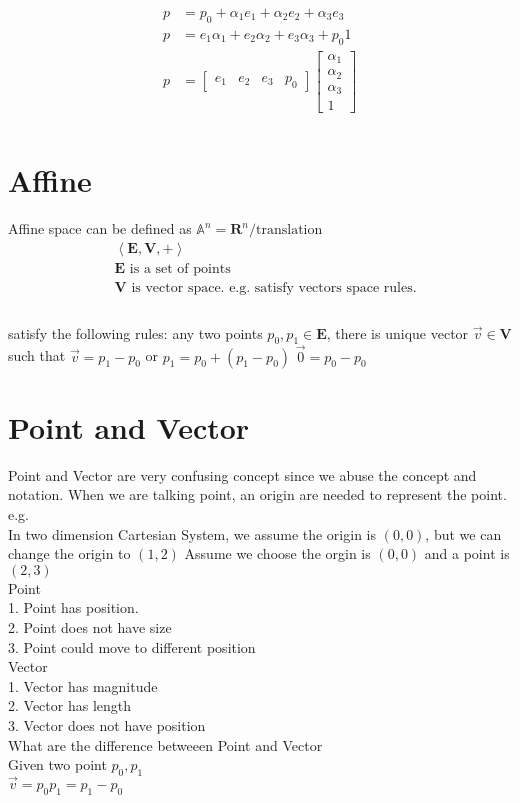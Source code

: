 \documentclass[UTF8]{article}
\begin{document}
\begin{equation}
\begin{aligned}
    p &= p_0 + \alpha_1 e_1 + \alpha_2 e_2 + \alpha_3 e_3 \\
    p &= e_1 \alpha_1  + e_2 \alpha_2 + e_3 \alpha_3 + p_0 1 \\
    p &= \left[ \begin{array}{c|c|c|c} 
    e_1 & e_2 & e_3 & p_0 
    \end{array} 
    \right] 
    \left[ \begin{array}{cc} 
    \alpha_1 \\
    \alpha_2 \\
    \alpha_3 \\
    1 
    \end{array} 
    \right] \\
\end{aligned}
\end{equation} 

\section{Affine}
Affine space can be defined as $\mathbb{A}^n = \mathbf{R}^n / \text{translation}$ \\
\begin{align*}
 &\left< \mathbf{E}, \mathbf{V}, + \right> \\
 &\mathbf{E} \text{ is a set of points} \\
 & \mathbf{V} \text{ is vector space. e.g. satisfy vectors space rules.} \\
\end{align*} \\
satisfy the following rules:
any two points $p_0, p_1 \in \mathbf{E}$, there is unique vector $\vec{v} \in \mathbf{V}$ such that $\vec{v} = p_1 - p_0$ or $p_1 = p_0 + (p_1 - p_0)$
$\vec{0} = p_0 - p_0$ \\
%
\section{Point and Vector}
Point and Vector are very confusing concept since we abuse the concept and notation.
When we are talking point, an origin are needed to represent the point. e.g. \\
In two dimension Cartesian System, we assume the origin is $(0, 0)$, but we can change the origin to $(1, 2)$
Assume we choose the orgin is $(0, 0)$ and a point is $(2, 3)$ \\
Point \\
1. Point has position. \\
2. Point does not have size \\
3. Point could move to different position \\
Vector \\
1. Vector has magnitude \\
2. Vector has length \\
3. Vector does not have position \\
What are the difference betweeen Point and Vector \\
Given two point $p_0, p_1$ \\
$\vec{v} = p_0 p_1 = p_1 - p_0$
%
%
%
%
\end{document}

